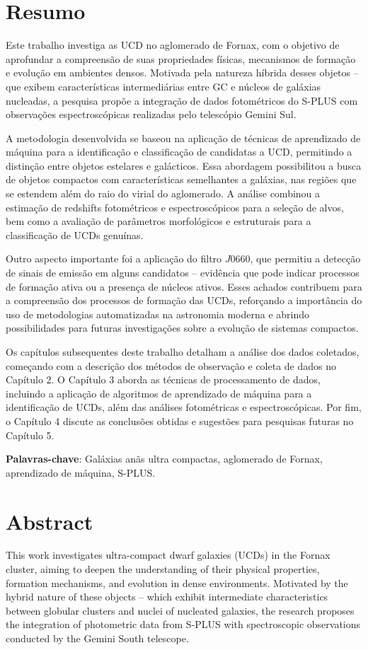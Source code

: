 \thispagestyle{empty}
\chapter*{Resumo}
Este trabalho investiga as \ac{UCD} no aglomerado de Fornax, com o objetivo de aprofundar a compreensão de suas propriedades físicas, mecanismos de formação e evolução em ambientes densos. Motivada pela natureza híbrida desses objetos – que exibem características intermediárias entre \ac{GC} e núcleos de galáxias nucleadas, a pesquisa propõe a integração de dados fotométricos do S-PLUS com observações espectroscópicas realizadas pelo telescópio Gemini Sul.

A metodologia desenvolvida se baseou na aplicação de técnicas de aprendizado de máquina para a identificação e classificação de candidatas a \ac{UCD}, permitindo a distinção entre objetos estelares e galácticos. Essa abordagem possibilitou a busca de objetos compactos com características semelhantes a galáxias, nas regiões que se estendem além do raio do virial do aglomerado. A análise combinou a estimação de redshifts fotométricos e espectroscópicos para a seleção de alvos, bem como a avaliação de parâmetros morfológicos e estruturais para a classificação de UCDs genuínas.

Outro aspecto importante foi a aplicação do filtro $J0660$, que permitiu a detecção de sinais de emissão em alguns candidatos – evidência que pode indicar processos de formação ativa ou a presença de núcleos ativos. Esses achados contribuem para a compreensão dos processos de formação das UCDs, reforçando a importância do uso de metodologias automatizadas na astronomia moderna e abrindo possibilidades para futuras investigações sobre a evolução de sistemas compactos.

Os capítulos subsequentes deste trabalho detalham a análise dos dados coletados, começando com a descrição dos métodos de observação e coleta de dados no Capítulo 2. O Capítulo 3 aborda as técnicas de processamento de dados, incluindo a aplicação de algoritmos de aprendizado de máquina para a identificação de UCDs, além das análises fotométricas e espectroscópicas. Por fim, o Capítulo 4 discute as conclusões obtidas e sugestões para pesquisas futuras no Capítulo 5.



\textbf{Palavras-chave}: Galáxias anãs ultra compactas, aglomerado de Fornax, aprendizado de máquina, S-PLUS.

\chapter*{Abstract}
This work investigates ultra-compact dwarf galaxies (UCDs) in the Fornax cluster, aiming to deepen the understanding of their physical properties, formation mechanisms, and evolution in dense environments. Motivated by the hybrid nature of these objects – which exhibit intermediate characteristics between globular clusters and nuclei of nucleated galaxies, the research proposes the integration of photometric data from S-PLUS with spectroscopic observations conducted by the Gemini South telescope.

